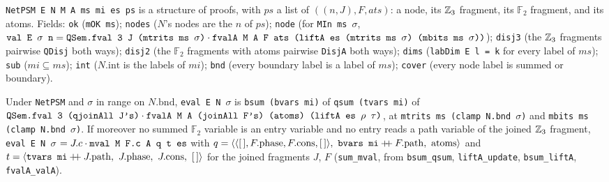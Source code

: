 \begin{definition}\label{def:lean-pathsum-netpsm}
\textnormal{\texttt{NetPSM E N M A ms mi es ps}} is a structure of proofs, with
$ps$ a list of $((n, J), F, \mathit{ats})$: a node, its $\mathbb{Z}_{3}$ fragment, its $\mathbb F_2$ fragment, and
its atoms. Fields: \textnormal{\texttt{ok}} (\textnormal{\texttt{mOK ms}}); \textnormal{\texttt{nodes}} ($N$'s nodes are the $n$ of $ps$);
\textnormal{\texttt{node}} (for \textnormal{\texttt{MIn ms \ensuremath{\sigma}}},
$\textnormal{\texttt{val E \ensuremath{\sigma} n}} = \textnormal{\texttt{QSem.fval 3 J (mtrits ms \ensuremath{\sigma})}}\cdot\textnormal{\texttt{fvalA M A F ats (liftA es (mtrits ms \ensuremath{\sigma}) (mbits ms \ensuremath{\sigma}))}}$);
\textnormal{\texttt{disj3}} (the $\mathbb{Z}_{3}$ fragments pairwise \textnormal{\texttt{QDisj}} both ways); \textnormal{\texttt{disj2}} (the $\mathbb F_2$
fragments with atoms pairwise \textnormal{\texttt{DisjA}} both ways); \textnormal{\texttt{dims}} (\textnormal{\texttt{labDim E l = k}} for
every label of $ms$); \textnormal{\texttt{sub}} ($mi\subseteq ms$); \textnormal{\texttt{int}} ($N.\mathrm{int}$ is the labels of $mi$);
\textnormal{\texttt{bnd}} (every boundary label is a label of $ms$); \textnormal{\texttt{cover}} (every node label is summed or
boundary).
\end{definition}

\begin{theorem}
Under \textnormal{\texttt{NetPSM}} and $\sigma$ in range on $N.\mathrm{bnd}$, \textnormal{\texttt{eval E N \ensuremath{\sigma}}} is
\textnormal{\texttt{bsum (bvars mi)}} of \textnormal{\texttt{qsum (tvars mi)}} of
$\textnormal{\texttt{QSem.fval 3 (qjoinAll J's)}}\cdot\textnormal{\texttt{fvalA M A (joinAll F's) (atoms) (liftA es \ensuremath{\rho} \ensuremath{\tau})}}$, at
\textnormal{\texttt{mtrits ms (clamp N.bnd \ensuremath{\sigma})}} and \textnormal{\texttt{mbits ms (clamp N.bnd \ensuremath{\sigma})}}. If moreover no summed
$\mathbb F_2$ variable is an entry variable and no entry reads a path variable of the joined $\mathbb{Z}_{3}$
fragment, \textnormal{\texttt{eval E N \ensuremath{\sigma}}} $= J.c\cdot\textnormal{\texttt{mval M F.c A q t es}}$ with
$q = \langle\langle[\,],F.\mathrm{phase},F.\mathrm{cons},[\,]\rangle,\ \textnormal{\texttt{bvars mi}}\mathbin{+\!\!+}F.\mathrm{path},\ \text{atoms}\rangle$ and
$t=\langle\textnormal{\texttt{tvars mi}}\mathbin{+\!\!+}J.\mathrm{path},\ J.\mathrm{phase},\ J.\mathrm{cons},\ [\,]\rangle$ for the joined
fragments $J$, $F$ (\textnormal{\texttt{sum\_mval}}, from \textnormal{\texttt{bsum\_qsum}}, \textnormal{\texttt{liftA\_update}},
\textnormal{\texttt{bsum\_liftA}}, \textnormal{\texttt{fvalA\_valA}}).
\end{theorem}

